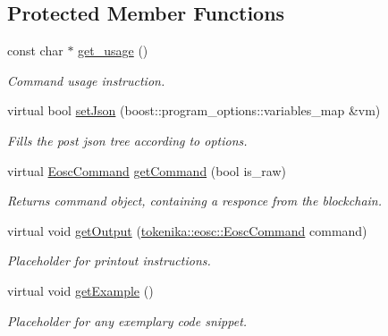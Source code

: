 \subsection*{Protected Member Functions}
\begin{DoxyCompactItemize}
\item 
const char $\ast$ \hyperlink{classtokenika_1_1eosc_1_1get__info_options_a67f3f76293b998c120559d6af5bf6c6f}{get\+\_\+usage} ()
\begin{DoxyCompactList}\small\item\em Command \textquotesingle{}usage\textquotesingle{} instruction. \end{DoxyCompactList}\item 
virtual bool \hyperlink{classtokenika_1_1eosc_1_1get__info_options_a8731c87cc2429a975e87ce36dd7fcf68}{set\+Json} (boost\+::program\+\_\+options\+::variables\+\_\+map \&vm)
\begin{DoxyCompactList}\small\item\em Fills the post json tree according to options. \end{DoxyCompactList}\item 
virtual \hyperlink{classtokenika_1_1eosc_1_1_eosc_command}{Eosc\+Command} \hyperlink{classtokenika_1_1eosc_1_1get__info_options_aafb814a03f00d5700e3fa66f17be43d2}{get\+Command} (bool is\+\_\+raw)
\begin{DoxyCompactList}\small\item\em Returns command object, containing a responce from the blockchain. \end{DoxyCompactList}\item 
virtual void \hyperlink{classtokenika_1_1eosc_1_1get__info_options_aedbefe0b0c3a7efca9429066588492db}{get\+Output} (\hyperlink{classtokenika_1_1eosc_1_1_eosc_command}{tokenika\+::eosc\+::\+Eosc\+Command} command)
\begin{DoxyCompactList}\small\item\em Placeholder for printout instructions. \end{DoxyCompactList}\item 
\mbox{\label{classtokenika_1_1eosc_1_1get__info_options_aeaa2596236e215617b19f4e6af5f943d}} 
virtual void \hyperlink{classtokenika_1_1eosc_1_1get__info_options_aeaa2596236e215617b19f4e6af5f943d}{get\+Example} ()
\begin{DoxyCompactList}\small\item\em Placeholder for any exemplary code snippet. \end{DoxyCompactList}\end{DoxyCompactItemize}
